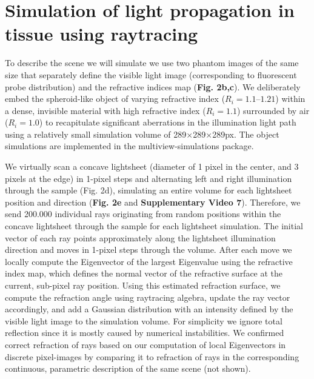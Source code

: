 \section{Simulation of light propagation in tissue using raytracing}
\label{sec:raytracing}

To describe the scene we will simulate we use two phantom images of the same size that separately define the visible light image (corresponding to fluorescent probe distribution) and the refractive indices map (\textbf{Fig. 2b,c}). We deliberately embed the spheroid-like object of varying refractive index ($R_i=1.1 – 1.21$) within a dense, invisible material with high refractive index ($R_i=1.1$) surrounded by air ($R_i=1.0$) to recapitulate significant aberrations in the illumination light path using a relatively small simulation volume of 289$\times$289$\times$289px. The object simulations are implemented in the multiview-simulations package\cite{mvdecon}.

We virtually scan a concave lightsheet (diameter of 1 pixel in the center, and 3 pixels at the edge) in 1-pixel steps and alternating left and right illumination through the sample (Fig. 2d), simulating an entire volume for each lightsheet position and direction (\textbf{Fig. 2e} and \textbf{Supplementary Video 7}). Therefore, we send 200.000 individual rays originating from random positions within the concave lightsheet through the sample for each lightsheet simulation. The initial vector of each ray points approximately along the lightsheet illumination direction and moves in 1-pixel steps through the volume. After each move we locally compute the Eigenvector of the largest Eigenvalue using the refractive index map, which defines the normal vector of the refractive surface at the current, sub-pixel ray position. Using this estimated refraction surface, we compute the refraction angle using raytracing algebra\cite{raytracing}, update the ray vector accordingly, and add a Gaussian distribution with an intensity defined by the visible light image to the simulation volume. For simplicity we ignore total reflection since it is mostly caused by numerical instabilities. We confirmed correct refraction of rays based on our computation of local Eigenvectors in discrete pixel-images by comparing it to refraction of rays in the corresponding continuous, parametric description of the same scene (not shown). 

